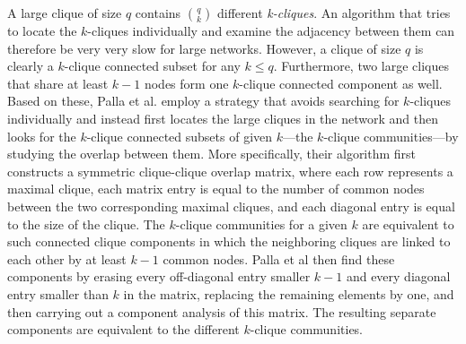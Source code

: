 A large clique of size $q$ contains $\binom{q}{k}$ different {\em k-cliques}.
An algorithm that tries to locate the $k$-cliques individually and examine the adjacency
between them can therefore be very very slow for large networks. However, a clique of size $q$
is clearly a $k$-clique connected subset for any $k \leq q$. Furthermore, two large
cliques that share at least $k-1$ nodes form one $k$-clique connected component as well.
Based on these, Palla et al. employ a strategy that avoids searching for $k$-cliques individually
and instead first locates the large cliques in the network and then looks for the $k$-clique connected subsets of given $k$---the $k$-clique communities---by studying the overlap between them.
More specifically, their algorithm first constructs a symmetric clique-clique overlap matrix, 
where each row represents a maximal clique, each matrix entry is equal to the number of common nodes between the two corresponding maximal cliques, and each diagonal entry is equal to the
size of the clique. The $k$-clique communities for a given $k$ are equivalent to such connected 
clique components in which the neighboring cliques are linked to each other by at least $k-1$ common nodes. Palla et al then find these components by erasing every off-diagonal entry smaller $k-1$ and every diagonal entry smaller than $k$ in the matrix, replacing the remaining elements by one, and then carrying out a component analysis of this matrix. The resulting separate components are equivalent to the different $k$-clique communities.
       


